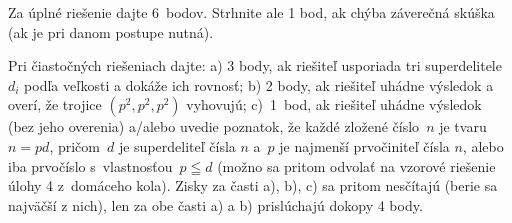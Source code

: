 {\schemaABC
Za úplné riešenie dajte 6~bodov. Strhnite ale 1 bod, ak chýba
záverečná skúška (ak je pri danom postupe nutná).

Pri čiastočných riešeniach dajte: a) 3 body, ak riešiteľ usporiada tri superdelitele $d_i$ podľa veľkosti a
dokáže ich rovnosť; b) 2 body, ak riešiteľ uhádne výsledok a
overí, že trojice $(p^2,p^2,p^2)$ vyhovujú; c)~1~bod,
ak riešiteľ uhádne výsledok (bez jeho overenia) a/alebo
uvedie poznatok, že každé zložené číslo~$n$ je tvaru $n=pd$,
pričom~$d$ je superdeliteľ čísla $n$ a~$p$ je najmenší prvočiniteľ čísla $n$,
alebo iba prvočíslo s~vlastnosťou~$p\leqq d$
(možno sa pritom odvolať na vzorové riešenie úlohy 4 z~domáceho kola).
Zisky za časti a), b), c) sa pritom nesčítajú (berie sa najväčší z
nich), len za obe časti a) a b) prislúchajú dokopy 4 body.
\endschema
}

